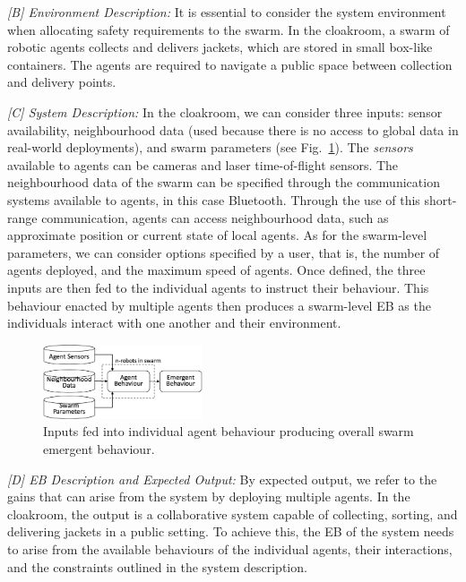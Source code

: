 \documentclass{article}
\begin{document}
\emph{[B] Environment Description:}
It is essential to consider the system environment when allocating safety requirements to the swarm. 
In the cloakroom, a swarm of robotic agents collects and delivers jackets, which are stored in small box-like containers. 
The agents are required to navigate a public space between collection and delivery points. 

\emph{[C] System Description:}
In the cloakroom, we can consider three inputs: sensor availability, neighbourhood data (used because there is no access to global data in real-world deployments), and swarm parameters (see Fig.~\ref{system-description}). The \emph{sensors} available to agents can be cameras and laser time-of-flight sensors. 
The neighbourhood data of the swarm can be specified through the communication systems available to agents, in this case Bluetooth. 
Through the use of this short-range communication, agents can access neighbourhood data, such as approximate position or current state of local agents.  
As for the swarm-level parameters, we can consider options specified by a user, that is, the number of agents deployed, and the maximum speed of agents. 
Once defined, the three inputs are then fed to the individual agents to instruct their behaviour. This behaviour enacted by multiple agents then produces a swarm-level EB as the individuals interact with one another and their environment. 
\begin{figure}[!h]
	\centering
	\centering
	\includegraphics[width=0.42\textwidth]{AERoS-Stage1-SystemA.pdf}
	\caption{Inputs fed into individual agent behaviour producing overall swarm emergent behaviour. }
	\label{system-description}
\end{figure}

\emph{[D] EB Description and Expected Output:}
By expected output, we refer to the gains that can arise from the system by deploying multiple agents. 
In the cloakroom, the output is a collaborative system capable of collecting, sorting, and delivering jackets in a public setting. 
To achieve this, the EB of the system needs to arise from the available behaviours of the individual agents, their interactions, and the constraints outlined in the system description.
\end{document}
